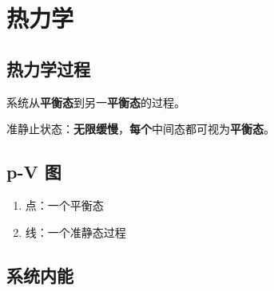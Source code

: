 \chapter{热力学}

\section{热力学过程}

系统从\textbf{平衡态}到另一\textbf{平衡态}的过程。

准静止状态：\textbf{无限缓慢}，\textbf{每个}中间态都可视为\textbf{平衡态}。

\section{p-V 图}

\begin{enumerate}
    \item 点：一个平衡态
    \item 线：一个准静态过程
\end{enumerate}

\section{系统内能}

